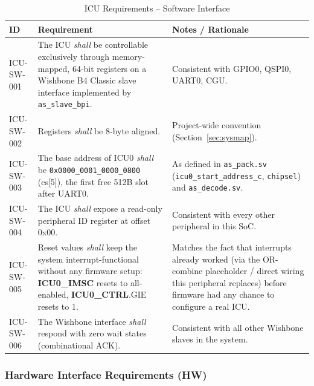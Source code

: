 \begin{table}[H]
\caption{ICU Requirements -- Software Interface}
\label{tab:asIcuReqSW}
\centering
\begin{tabularx}{\textwidth}{|l |X |X|}
  \hline
  ID & Requirement & Notes / Rationale \\
  \hline
  \hline
  ICU-SW-001 &
    The ICU \textit{shall} be controllable exclusively through
    memory-mapped, 64-bit registers on a Wishbone B4 Classic slave
    interface implemented by \texttt{as\_slave\_bpi}. &
    Consistent with GPIO0, QSPI0, UART0, CGU. \\
  \hline
  ICU-SW-002 &
    Registers \textit{shall} be 8-byte aligned. &
    Project-wide convention (Section~\ref{sec:sysmap}). \\
  \hline
  ICU-SW-003 &
    The base address of ICU0 \textit{shall} be
    \texttt{0x0000\_0001\_0000\_0800} (cs[5]), the first free 512\;B slot
    after UART0. &
    As defined in \texttt{as\_pack.sv} (\texttt{icu0\_start\_address\_c},
    \texttt{chipsel}) and \texttt{as\_decode.sv}. \\
  \hline
  ICU-SW-004 &
    The ICU \textit{shall} expose a read-only peripheral ID register at
    offset 0x00. &
    Consistent with every other peripheral in this SoC. \\
  \hline
  ICU-SW-005 &
    Reset values \textit{shall} keep the system interrupt-functional
    without any firmware setup: \textbf{ICU0\_IMSC} resets to all-enabled,
    \textbf{ICU0\_CTRL}.GIE resets to 1. &
    Matches the fact that interrupts already worked (via the OR-combine
    placeholder / direct wiring this peripheral replaces) before firmware
    had any chance to configure a real ICU. \\
  \hline
  ICU-SW-006 &
    The Wishbone interface \textit{shall} respond with zero wait states
    (combinational ACK). &
    Consistent with all other Wishbone slaves in the system. \\
  \hline
\end{tabularx}
\end{table}

\subsubsection{Hardware Interface Requirements (HW)}

